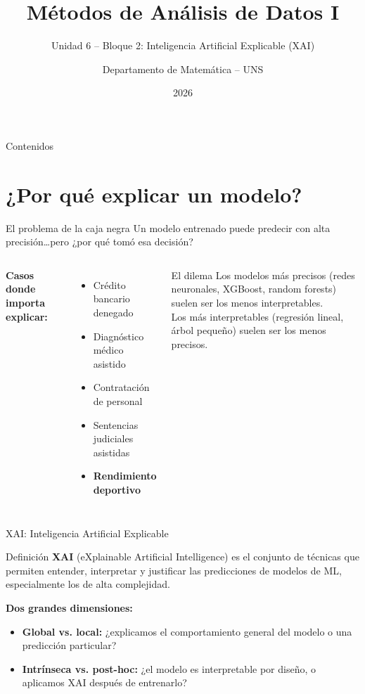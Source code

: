 \documentclass[aspectratio=169]{beamer}
\title[MAD1 -- U6]{Métodos de Análisis de Datos I}
\subtitle{Unidad 6 -- Bloque 2: Inteligencia Artificial Explicable (XAI)}
\author{Departamento de Matemática -- UNS}
\date{2026}
\begin{document}
\begin{frame}
  \titlepage
\end{frame}

\begin{frame}{Contenidos}
  \tableofcontents
\end{frame}

\section{¿Por qué explicar un modelo?}

\begin{frame}{El problema de la caja negra}
  Un modelo entrenado puede predecir con alta precisión\ldots pero ¿por qué tomó esa decisión?

  \bigskip
  \begin{columns}
      \textbf{Casos donde importa explicar:}
      \begin{itemize}
        \item Crédito bancario denegado
        \item Diagnóstico médico asistido
        \item Contratación de personal
        \item Sentencias judiciales asistidas
        \item \textbf{Rendimiento deportivo}
      \end{itemize}
      \begin{alertblock}{El dilema}
        Los modelos más precisos (redes neuronales, XGBoost, random forests) suelen ser los menos interpretables.\\
        Los más interpretables (regresión lineal, árbol pequeño) suelen ser los menos precisos.
      \end{alertblock}
  \end{columns}
\end{frame}

\begin{frame}{XAI: Inteligencia Artificial Explicable}
  \begin{block}{Definición}
    \textbf{XAI} (eXplainable Artificial Intelligence) es el conjunto de técnicas que permiten entender, interpretar y justificar las predicciones de modelos de ML, especialmente los de alta complejidad.
  \end{block}

  \bigskip
  \textbf{Dos grandes dimensiones:}
  \begin{itemize}
    \item \textbf{Global vs. local:} ¿explicamos el comportamiento general del modelo o una predicción particular?
    \item \textbf{Intrínseca vs. post-hoc:} ¿el modelo es interpretable por diseño, o aplicamos XAI después de entrenarlo?
  \end{itemize}
\end{frame}
\end{document}
